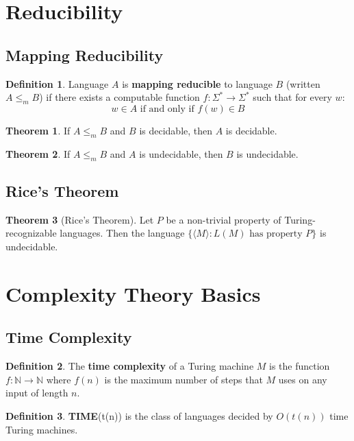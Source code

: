 \documentclass[11pt]{article}
\theoremstyle{definition}
\newtheorem{definition}{Definition}[section]
\newtheorem{theorem}{Theorem}[section]
\begin{document}
\section{Reducibility}

\subsection{Mapping Reducibility}
\begin{definition}
Language $A$ is \textbf{mapping reducible} to language $B$ (written $A \leq_m B$) if there exists a computable function $f: \Sigma^* \to \Sigma^*$ such that for every $w$:
$$w \in A \text{ if and only if } f(w) \in B$$
\end{definition}

\begin{theorem}
If $A \leq_m B$ and $B$ is decidable, then $A$ is decidable.
\end{theorem}

\begin{theorem}
If $A \leq_m B$ and $A$ is undecidable, then $B$ is undecidable.
\end{theorem}

\subsection{Rice's Theorem}
\begin{theorem}[Rice's Theorem]
Let $P$ be a non-trivial property of Turing-recognizable languages. Then the language $\{\langle M \rangle : L(M) \text{ has property } P\}$ is undecidable.
\end{theorem}

\section{Complexity Theory Basics}

\subsection{Time Complexity}
\begin{definition}
The \textbf{time complexity} of a Turing machine $M$ is the function $f: \mathbb{N} \to \mathbb{N}$ where $f(n)$ is the maximum number of steps that $M$ uses on any input of length $n$.
\end{definition}

\begin{definition}
\textbf{TIME}(t(n)) is the class of languages decided by $O(t(n))$ time Turing machines.
\end{definition}
\end{document}
